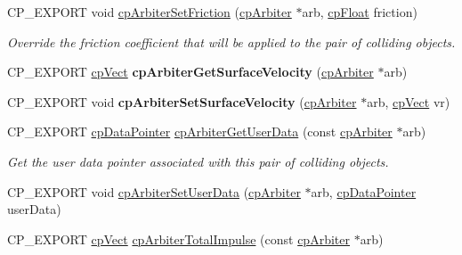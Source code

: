 \begin{DoxyCompactItemize}
C\+P\+\_\+\+E\+X\+P\+O\+RT void \mbox{\hyperlink{group__cp_arbiter_gab049136b2e62e92adfde8f6422664f71}{cp\+Arbiter\+Set\+Friction}} (\mbox{\hyperlink{structcp_arbiter}{cp\+Arbiter}} $\ast$arb, \mbox{\hyperlink{group__basic_types_gac1ed65573e035bf892505768c852d8d3}{cp\+Float}} friction)
\begin{DoxyCompactList}\small\item\em Override the friction coefficient that will be applied to the pair of colliding objects. \end{DoxyCompactList}\item 
\mbox{\label{group__cp_arbiter_gaede8b70f4bb8e5f1e74eaffa210f3824}} 
C\+P\+\_\+\+E\+X\+P\+O\+RT \mbox{\hyperlink{structcp_vect}{cp\+Vect}} {\bfseries cp\+Arbiter\+Get\+Surface\+Velocity} (\mbox{\hyperlink{structcp_arbiter}{cp\+Arbiter}} $\ast$arb)
\item 
\mbox{\label{group__cp_arbiter_ga71e72c2b8ec0770a2cb2c8d423fce42b}} 
C\+P\+\_\+\+E\+X\+P\+O\+RT void {\bfseries cp\+Arbiter\+Set\+Surface\+Velocity} (\mbox{\hyperlink{structcp_arbiter}{cp\+Arbiter}} $\ast$arb, \mbox{\hyperlink{structcp_vect}{cp\+Vect}} vr)
\item 
\mbox{\label{group__cp_arbiter_ga97ebdb266ac42a9d10169374c233865d}} 
C\+P\+\_\+\+E\+X\+P\+O\+RT \mbox{\hyperlink{group__basic_types_ga2ac2c3c31e21893941f9e4f8ee279447}{cp\+Data\+Pointer}} \mbox{\hyperlink{group__cp_arbiter_ga97ebdb266ac42a9d10169374c233865d}{cp\+Arbiter\+Get\+User\+Data}} (const \mbox{\hyperlink{structcp_arbiter}{cp\+Arbiter}} $\ast$arb)
\begin{DoxyCompactList}\small\item\em Get the user data pointer associated with this pair of colliding objects. \end{DoxyCompactList}\item 
C\+P\+\_\+\+E\+X\+P\+O\+RT void \mbox{\hyperlink{group__cp_arbiter_gafb92e7ea05fb11021ce3f01ff4baa067}{cp\+Arbiter\+Set\+User\+Data}} (\mbox{\hyperlink{structcp_arbiter}{cp\+Arbiter}} $\ast$arb, \mbox{\hyperlink{group__basic_types_ga2ac2c3c31e21893941f9e4f8ee279447}{cp\+Data\+Pointer}} user\+Data)
\item 
C\+P\+\_\+\+E\+X\+P\+O\+RT \mbox{\hyperlink{structcp_vect}{cp\+Vect}} \mbox{\hyperlink{group__cp_arbiter_ga7dcf707be34b3ecddba4d61ff9d11415}{cp\+Arbiter\+Total\+Impulse}} (const \mbox{\hyperlink{structcp_arbiter}{cp\+Arbiter}} $\ast$arb)

\end{DoxyCompactItemize}
